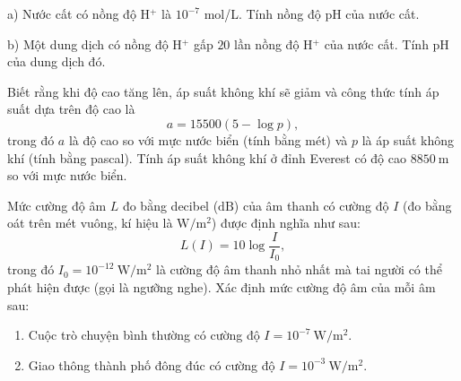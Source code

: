 \begin{bt}%
	\hfill
	\begin{listEX}[1]
		\item[a)] Nước cất có nồng độ  H$^+ $ là $ 10^{-7} $ mol/L. Tính nồng độ pH của nước cất.
		\item[b)] Một dung dịch có nồng độ  H$^+ $ gấp $ 20 $ lần nồng độ  H$^+ $ của nước cất. Tính pH của dung dịch đó. 
	\end{listEX}
\end{bt}
\begin{bt}%
	Biết rằng khi độ cao tăng lên, áp suất không khí sẽ giảm và công thức tính áp suất dựa trên độ cao là $$ a=15500(5-\log p), $$ trong đó $a$ là độ cao so với mực nước biển (tính bằng mét) và $p$ là áp suất không khí (tính bằng pascal). Tính áp suất không khí ở đỉnh Everest có độ cao $8850 \mathrm{~m}$ so với mực nước biển.
\end{bt}

\begin{bt}%
	Mức cường độ âm $L$ đo bằng decibel ($\mathrm{dB}$) của âm thanh có cường độ $I$ (đo bằng oát trên mét vuông, kí hiệu là $\mathrm{W}/\mathrm{m}^2$) được định nghĩa như sau: $$ L(I)=10 \log \dfrac{I}{I_0}, $$  trong đó $I_0=10^{-12} \mathrm{~W}/\mathrm{m}^2$ là cường độ âm thanh nhỏ nhất mà tai người có thể phát hiện được (gọi là ngưỡng nghe). Xác định mức cường độ âm của mỗi âm sau:
	\begin{enumerate}
		\item Cuộc trò chuyện bình thường có cường độ $I=10^{-7} \mathrm{~W} / \mathrm{m}^2$.
		\item  Giao thông thành phố đông đúc có cường độ $I=10^{-3} \mathrm{~W} / \mathrm{m}^2$. 
	\end{enumerate}
\end{bt}
